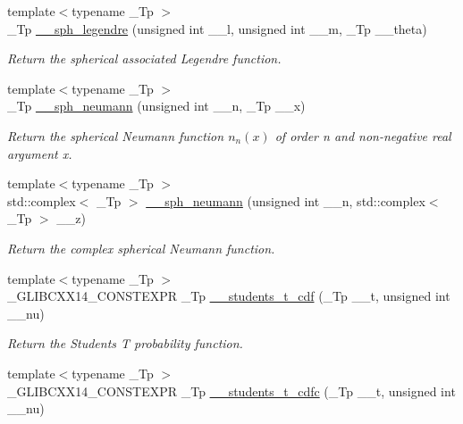 \begin{DoxyCompactItemize}
{\footnotesize template$<$typename \+\_\+\+Tp $>$ }\\\+\_\+\+Tp \hyperlink{namespacestd_1_1____detail_a1c819d02915bdc2ab5c7693513ce0be0}{\+\_\+\+\_\+sph\+\_\+legendre} (unsigned int \+\_\+\+\_\+l, unsigned int \+\_\+\+\_\+m, \+\_\+\+Tp \+\_\+\+\_\+theta)
\begin{DoxyCompactList}\small\item\em Return the spherical associated Legendre function. \end{DoxyCompactList}\item 
{\footnotesize template$<$typename \+\_\+\+Tp $>$ }\\\+\_\+\+Tp \hyperlink{namespacestd_1_1____detail_a94ac68003333b86b157a3b1e6ce44830}{\+\_\+\+\_\+sph\+\_\+neumann} (unsigned int \+\_\+\+\_\+n, \+\_\+\+Tp \+\_\+\+\_\+x)
\begin{DoxyCompactList}\small\item\em Return the spherical Neumann function $ n_n(x) $ of order n and non-\/negative real argument {\ttfamily x}. \end{DoxyCompactList}\item 
{\footnotesize template$<$typename \+\_\+\+Tp $>$ }\\std\+::complex$<$ \+\_\+\+Tp $>$ \hyperlink{namespacestd_1_1____detail_ac72e28d4d5fb8b0ffa033b9a47b67a8e}{\+\_\+\+\_\+sph\+\_\+neumann} (unsigned int \+\_\+\+\_\+n, std\+::complex$<$ \+\_\+\+Tp $>$ \+\_\+\+\_\+z)
\begin{DoxyCompactList}\small\item\em Return the complex spherical Neumann function. \end{DoxyCompactList}\item 
{\footnotesize template$<$typename \+\_\+\+Tp $>$ }\\\+\_\+\+G\+L\+I\+B\+C\+X\+X14\+\_\+\+C\+O\+N\+S\+T\+E\+X\+P\+R \+\_\+\+Tp \hyperlink{namespacestd_1_1____detail_a89f7ee0534b6e11b801dc4f84c749bbd}{\+\_\+\+\_\+students\+\_\+t\+\_\+cdf} (\+\_\+\+Tp \+\_\+\+\_\+t, unsigned int \+\_\+\+\_\+nu)
\begin{DoxyCompactList}\small\item\em Return the Students T probability function. \end{DoxyCompactList}\item 
{\footnotesize template$<$typename \+\_\+\+Tp $>$ }\\\+\_\+\+G\+L\+I\+B\+C\+X\+X14\+\_\+\+C\+O\+N\+S\+T\+E\+X\+P\+R \+\_\+\+Tp \hyperlink{namespacestd_1_1____detail_a4f44edc56879cb0d396726be8ea66828}{\+\_\+\+\_\+students\+\_\+t\+\_\+cdfc} (\+\_\+\+Tp \+\_\+\+\_\+t, unsigned int \+\_\+\+\_\+nu)

\end{DoxyCompactItemize}
